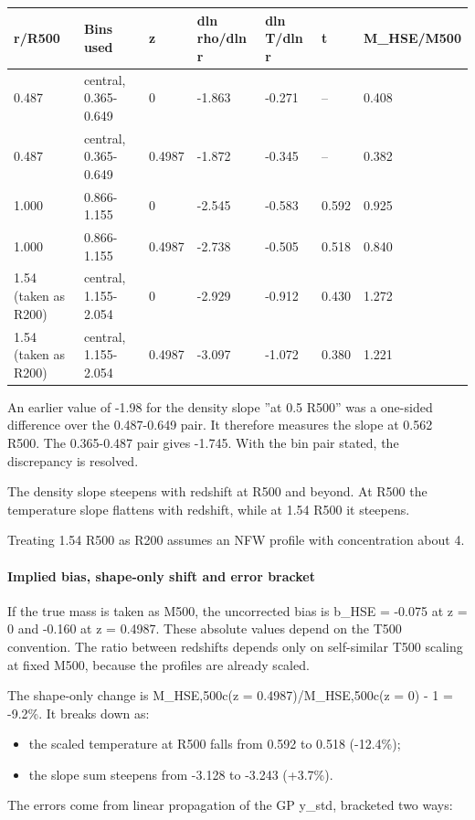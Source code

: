 \documentclass[11pt,a4paper]{article}
\begin{document}
\begin{longtable}{@{}p{}p{}p{}p{}p{}p{}p{}@{}}
\toprule
\textbf{r/R500} & \textbf{Bins used} & \textbf{z} & \textbf{dln rho/dln r} & \textbf{dln T/dln r} & \textbf{t} & \textbf{M\_HSE/M500} \\ \midrule \endhead
0.487 & central, 0.365-0.649 & 0 & -1.863 & -0.271 & -- & 0.408 \\
0.487 & central, 0.365-0.649 & 0.4987 & -1.872 & -0.345 & -- & 0.382 \\
1.000 & 0.866-1.155 & 0 & -2.545 & -0.583 & 0.592 & 0.925 \\
1.000 & 0.866-1.155 & 0.4987 & -2.738 & -0.505 & 0.518 & 0.840 \\
1.54 (taken as R200) & central, 1.155-2.054 & 0 & -2.929 & -0.912 & 0.430 & 1.272 \\
1.54 (taken as R200) & central, 1.155-2.054 & 0.4987 & -3.097 & -1.072 & 0.380 & 1.221 \\
\bottomrule\end{longtable}
An earlier value of -1.98 for the density slope ''at 0.5 R500'' was a one-sided difference over the 0.487-0.649 pair. It therefore measures the slope at 0.562 R500. The 0.365-0.487 pair gives -1.745. With the bin pair stated, the discrepancy is resolved.

The density slope steepens with redshift at R500 and beyond. At R500 the temperature slope flattens with redshift, while at 1.54 R500 it steepens.

Treating 1.54 R500 as R200 assumes an NFW profile with concentration about 4.

\paragraph{Implied bias, shape-only shift and error bracket}
If the true mass is taken as M500, the uncorrected bias is b\_HSE = -0.075 at z = 0 and -0.160 at z = 0.4987. These absolute values depend on the T500 convention. The ratio between redshifts depends only on self-similar T500 scaling at fixed M500, because the profiles are already scaled.

The shape-only change is M\_HSE,500c(z = 0.4987)/M\_HSE,500c(z = 0) - 1 = -9.2\%. It breaks down as:

\begin{itemize}
  \item the scaled temperature at R500 falls from 0.592 to 0.518 (-12.4\%);
  \item the slope sum steepens from -3.128 to -3.243 (+3.7\%).
\end{itemize}
The errors come from linear propagation of the GP y\_std, bracketed two ways:
\end{document}
